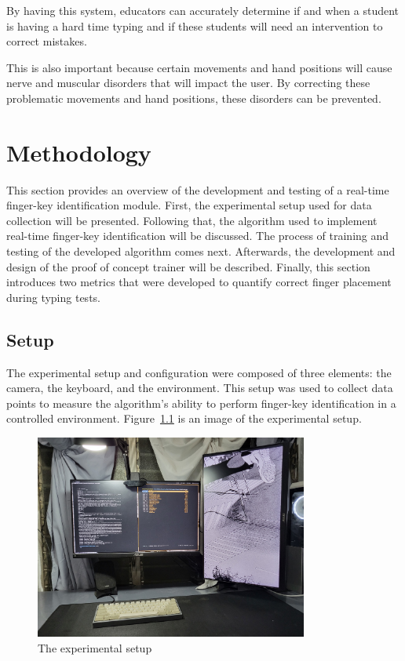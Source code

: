 \documentclass{report}
\begin{document}
By having this system, educators can accurately determine if and when a student
is having a hard time typing and if these students will need an intervention to
correct mistakes.

This is also important because certain movements and hand positions will cause
nerve and muscular disorders that will impact the user. By correcting these
problematic movements and hand positions, these disorders can be prevented.

\chapter{Methodology}

This section provides an overview of the development and testing of a real-time
finger-key identification module. First, the experimental setup used for data
collection will be presented. Following that, the algorithm used to implement
real-time finger-key identification will be discussed. The process of training
and testing of the developed algorithm comes next. Afterwards, the development
and design of the proof of concept trainer will be described. Finally, this
section introduces two metrics that were developed to quantify correct finger
placement during typing tests.

\section{Setup}
\label{section:metho-setup}

The experimental setup and configuration were composed of three elements: the
camera, the keyboard, and the environment. This setup was used to collect data
points to measure the algorithm's ability to perform finger-key identification
in a controlled environment. Figure~\ref{fig:metho-setup} is an image of the
experimental setup.


\begin{figure}[H]
	\centering
	\includegraphics[width=0.8\textwidth]{full-setup.jpg}
	\caption{The experimental setup}
	\label{fig:metho-setup}
	\centering
\end{figure}
\end{document}
